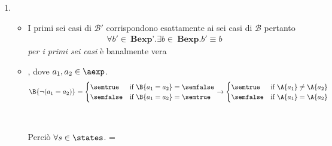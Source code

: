 {\begin{enumerate}[label=\alph*)]
   = 
  \caseFun{\semtrue}
          { = \semfalse \ \mbox{ or } \
             = \semtrue}
          {\semfalse}
          { = \semtrue \ \mbox{ and } \ 
             = \semfalse} \\ \\

   =
  \caseFun{\semtrue}
          {( = \semtrue \mbox{ and }  = \semtrue)
           \mbox{ or }
           ( = \semfalse \mbox{ and }  = \semfalse)}
          {\semfalse}
          {( = \semtrue \mbox{ or }  = \semtrue)
           \mbox{ and }
           (\Bext{b_1} = \semfalse \mbox{ or } \Bext{b_2} = \semfalse)}
          \\ \\

\item
  \begin{itemize}
    \item I primi sei casi di $\mathcal{B}'$ corrispondono esattamente ai sei
casi di $\mathcal{B}$ pertanto
      \begin{align*}
        \forall b' \in \ \textbf{Bexp'}.\exists b \in 
        \ \textbf{Bexp}.b' \equiv b
      \end{align*}
      \textit{per i primi sei casi} è banalmente vera

    \item {}, dove $a_1, a_2 \in \aexp$. \\ 
      \begin{align*}
        \B{\lnot (a_1 = a_2)} =
        \begin{cases}
          \semtrue &
          \mbox{if} \ \B{a_1 = a_2} = \semfalse \\
          \semfalse &
          \mbox{if} \ \B{a_1 = a_2} = \semtrue \\
        \end{cases}
        \rightarrow
        \begin{cases}
          \semtrue &
          \mbox{if} \ \A{a_1} \neq  \A{a_2} \\
          \semfalse &
          \mbox{if} \ \A{a_1} = \A{a_2} \\
        \end{cases}
      \end{align*} \\ \\
      Perciò $\forall s \in \states$. =  \\


\end{itemize}
\end{enumerate}}
